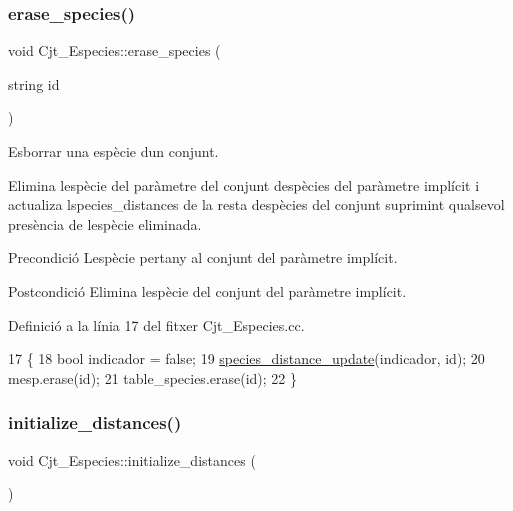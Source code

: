 \subsubsection{\texorpdfstring{erase\+\_\+species()}{erase\_species()}}
{\footnotesize\ttfamily void Cjt\+\_\+\+Especies\+::erase\+\_\+species (\begin{DoxyParamCaption}\item[{string}]{id }\end{DoxyParamCaption})}



Esborrar una espècie d\textquotesingle{}un conjunt. 

Elimina l\textquotesingle{}espècie del paràmetre del conjunt d\textquotesingle{}espècies del paràmetre implícit i actualiza l\textquotesingle{}species\+\_\+distances de la resta d\textquotesingle{}espècies del conjunt suprimint qualsevol presència de l\textquotesingle{}espècie eliminada.

\begin{DoxyPrecond}{Precondició}
L\textquotesingle{}espècie pertany al conjunt del paràmetre implícit. 
\end{DoxyPrecond}
\begin{DoxyPostcond}{Postcondició}
Elimina l\textquotesingle{}espècie del conjunt del paràmetre implícit. 
\end{DoxyPostcond}


Definició a la línia 17 del fitxer Cjt\+\_\+\+Especies.\+cc.


\begin{DoxyCode}
17                                           \{
18     \textcolor{keywordtype}{bool} indicador = \textcolor{keyword}{false};
19     \hyperlink{class_cjt___especies_a043f6ce127ac78eb891f6d004eee40b0}{species\_distance\_update}(indicador, \textcolor{keywordtype}{id});
20     mesp.erase(\textcolor{keywordtype}{id});
21     table\_species.erase(\textcolor{keywordtype}{id});
22 \}
\end{DoxyCode}
\mbox{\label{class_cjt___especies_ab041e83795b06d02ba7bad8422189361}} 
\subsubsection{\texorpdfstring{initialize\+\_\+distances()}{initialize\_distances()}}
{\footnotesize\ttfamily void Cjt\+\_\+\+Especies\+::initialize\+\_\+distances (\begin{DoxyParamCaption}{ }\end{DoxyParamCaption})}



